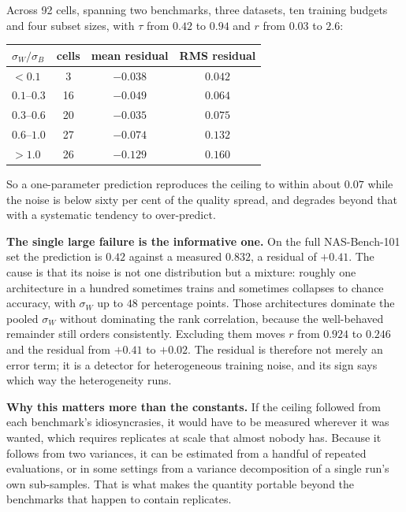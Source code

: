 \documentclass[11pt]{article}
\begin{document}
Across 92 cells, spanning two benchmarks, three datasets, ten training budgets and four subset sizes,
with $\tau$ from $0.42$ to $0.94$ and $r$ from $0.03$ to $2.6$:

\begin{center}\small
\begin{tabular}{lccc}
\toprule
$\sigma_W/\sigma_B$ & cells & mean residual & RMS residual \\
\midrule
$<0.1$      & 3  & $-0.038$ & $0.042$ \\
$0.1$--$0.3$ & 16 & $-0.049$ & $0.064$ \\
$0.3$--$0.6$ & 20 & $-0.035$ & $0.075$ \\
$0.6$--$1.0$ & 27 & $-0.074$ & $0.132$ \\
$>1.0$      & 26 & $-0.129$ & $0.160$ \\
\bottomrule
\end{tabular}
\end{center}

So a one-parameter prediction reproduces the ceiling to within about $0.07$ while the noise is below
sixty per cent of the quality spread, and degrades beyond that with a systematic tendency to
over-predict.

\textbf{The single large failure is the informative one.} On the full NAS-Bench-101 set the prediction is
$0.42$ against a measured $0.832$, a residual of $+0.41$. The cause is that its noise is not one
distribution but a mixture: roughly one architecture in a hundred sometimes trains and sometimes
collapses to chance accuracy, with $\sigma_W$ up to $48$ percentage points. Those architectures dominate
the pooled $\sigma_W$ without dominating the rank correlation, because the well-behaved remainder still
orders consistently. Excluding them moves $r$ from $0.924$ to $0.246$ and the residual from $+0.41$ to
$+0.02$. The residual is therefore not merely an error term; it is a detector for heterogeneous training
noise, and its sign says which way the heterogeneity runs.

\textbf{Why this matters more than the constants.} If the ceiling followed from each benchmark's
idiosyncrasies, it would have to be measured wherever it was wanted, which requires replicates at scale
that almost nobody has. Because it follows from two variances, it can be estimated from a handful of
repeated evaluations, or in some settings from a variance decomposition of a single run's own
sub-samples. That is what makes the quantity portable beyond the benchmarks that happen to contain
replicates.
\end{document}
